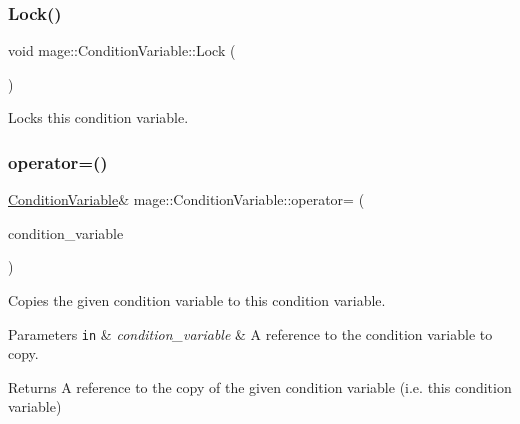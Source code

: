 \subsubsection{\texorpdfstring{Lock()}{Lock()}}
{\footnotesize\ttfamily void mage\+::\+Condition\+Variable\+::\+Lock (\begin{DoxyParamCaption}{ }\end{DoxyParamCaption})\hspace{0.3cm}{\ttfamily [noexcept]}}

Locks this condition variable. \hypertarget{structmage_1_1_condition_variable_ac83eae5353cd004ee06fe2376e5bdbf4}{}\label{structmage_1_1_condition_variable_ac83eae5353cd004ee06fe2376e5bdbf4} 
\subsubsection{\texorpdfstring{operator=()}{operator=()}\hspace{0.1cm}{\footnotesize\ttfamily [1/2]}}
{\footnotesize\ttfamily \hyperlink{structmage_1_1_condition_variable}{Condition\+Variable}\& mage\+::\+Condition\+Variable\+::operator= (\begin{DoxyParamCaption}\item[{const \hyperlink{structmage_1_1_condition_variable}{Condition\+Variable} \&}]{condition\+\_\+variable }\end{DoxyParamCaption})\hspace{0.3cm}{\ttfamily [delete]}}

Copies the given condition variable to this condition variable.


\begin{DoxyParams}[1]{Parameters}
\mbox{\tt in}  & {\em condition\+\_\+variable} & A reference to the condition variable to copy. \\
\hline
\end{DoxyParams}
\begin{DoxyReturn}{Returns}
A reference to the copy of the given condition variable (i.\+e. this condition variable) 
\end{DoxyReturn}
\hypertarget{structmage_1_1_condition_variable_a3f05c5b53b2530e9fdd1bb890aa375c4}{}\label{structmage_1_1_condition_variable_a3f05c5b53b2530e9fdd1bb890aa375c4} 
